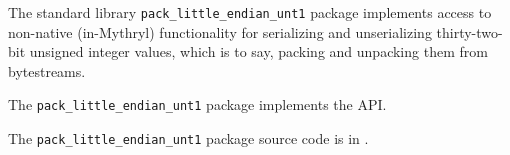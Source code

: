 
The standard library {\tt pack\_little\_endian\_unt1} package implements access to 
non-native (in-Mythryl) functionality for 
serializing and unserializing thirty-two-bit unsigned integer values, which is to say, 
packing and unpacking them from bytestreams.

The {\tt pack\_little\_endian\_unt1} package implements the 
 API.

The {\tt pack\_little\_endian\_unt1} package source code is in .



